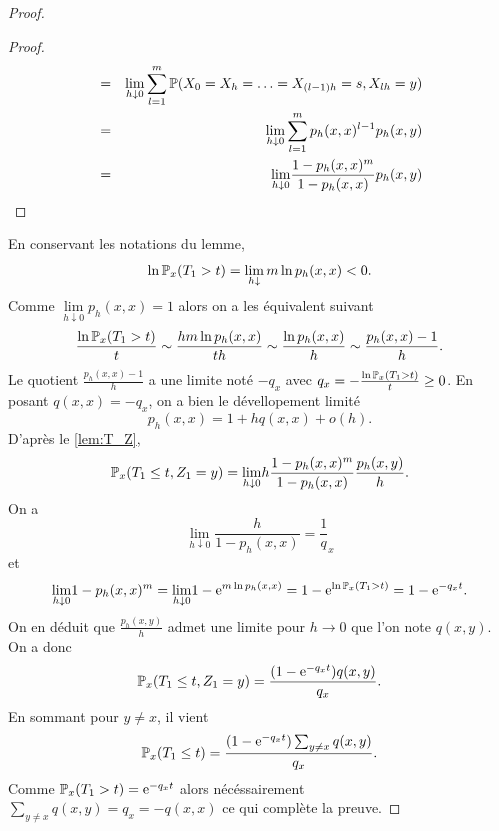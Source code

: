\begin{proof}
\begin{proof}
\begin{eqnarray*}
&=&\underset{h\downarrow 0}{\lim}\sum_{l =1}^m \mathbb{P}(X_0 = X_h = \ldots= X_{(l-1)h} = s,X_{lh} = y)\\
&=&\underset{h\downarrow 0}{\lim}\sum_{l =1}^m p_h(x,x)^{l-1} p_h(x,y)\\
&=&\underset{h\downarrow 0}{\lim}\frac{1-p_h(x,x)^m}{1-p_h(x,x)} p_h(x,y)\\
\end{eqnarray*}
\end{proof}
En conservant les notations du lemme, 
$$
\ln \mathbb{P}_x(T_1>t) = \underset{h\downarrow}{\lim}\,m\ln p_h(x,x) <0.
$$
Comme $\underset{h\downarrow 0}{\lim} p_h(x,x) =1$ alors on a les équivalent suivant 
$$
\frac{\ln \mathbb{P}_x(T_1 > t )}{t}\sim \frac{hm\ln p_h(x,x)}{th}\sim \frac{\ln p_h(x,x)}{h}\sim \frac{p_h(x,x) - 1}{h}.
$$
Le quotient $\frac{p_h(x,x) - 1}{h}$ a une limite noté $- q_x$ avec $q_x = -\frac{\ln\mathbb{P}_x(T_1>t)}{t}\geq 0$. En posant $q(x,x)=-q_x$, on a bien le dévellopement limité 
$$
p_h(x,x) = 1 + hq(x,x) + o(h).
$$
D'après le \cref{lem:T_Z},
$$
\mathbb{P}_x(T_1\leq t, Z_1 = y) = \underset{h\downarrow0}{\lim} h\frac{1-p_h(x,x)^m}{1-p_h(x,x)}\frac{p_h(x,y)}{h}.
$$
On a 
$$
\underset{h\downarrow0}{\lim} \frac{h}{1-p_h(x,x)} = \frac 1q_x
$$
et
$$
\underset{h\downarrow0}{\lim} 1-p_h(x,x)^m =\underset{h\downarrow0}{\lim} 1-\mathrm{e}^{m\ln p_h(x,x)} =1-\mathrm{e}^{\ln \mathbb{P}_x (T_1 >t)}=1-\mathrm{e}^{-q_x t}.
$$ 
On en déduit que $\frac{p_h(x,y)}{h}$ admet une limite pour $h\rightarrow 0$ que l'on note $q(x,y)$. On a donc
$$
\mathbb{P}_x(T_1\leq t, Z_1 = y) = \frac{(1-\mathrm{e}^{-q_x t})q(x,y)}{q_x}.
$$
En sommant pour $y\neq x$, il vient 
$$
\mathbb{P}_x(T_1\leq t) = \frac{(1-\mathrm{e}^{-q_x t})\sum_{y\neq x}q(x,y)}{q_x}.
$$
Comme $\mathbb{P}_x(T_1> t) = \mathrm{e}^{-q_x t }$ alors nécéssairement $\sum_{y\neq x}q(x,y)= q_x = -q(x,x)$ ce qui complète la preuve.
\end{proof}
